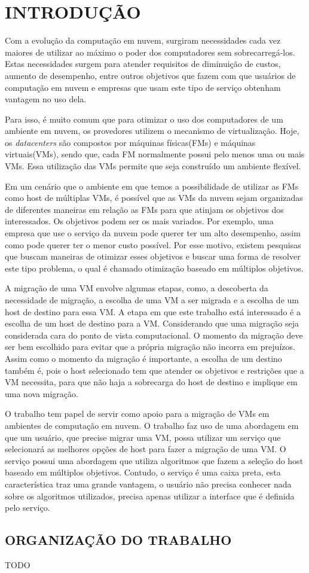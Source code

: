 \chapter{INTRODUÇÃO}
\label{chap:introducao}

Com a evolução da computação em nuvem, surgiram necessidades cada vez maiores de utilizar ao 
máximo o poder dos computadores sem sobrecarregá-los. Estas necessidades surgem para atender 
requisitos de diminuição de custos, aumento de desempenho, entre outros objetivos que fazem com que 
usuários de computação em nuvem e empresas que usam este tipo de serviço obtenham vantagem no uso dela.

Para isso, é muito comum que para otimizar o uso dos computadores de um ambiente em nuvem, 
os provedores utilizem o mecanismo de virtualização. Hoje, os \textit{datacenters} são compostos 
por máquinas físicas(FMs) e máquinas virtuais(VMs), sendo que, cada FM normalmente possui 
pelo menos uma ou mais VMs. Essa utilização das VMs permite que seja construído um ambiente flexível.

Em um cenário que o ambiente em que temos a possibilidade de utilizar as FMs como host de múltiplas VMs,
 é possível que as VMs da nuvem sejam organizadas de diferentes maneiras em relação as FMs para que atinjam 
 os objetivos dos interessados. Os objetivos podem ser os mais variados. Por exemplo, uma empresa que 
 use o serviço da nuvem pode querer ter um alto desempenho, assim como pode querer ter o menor custo 
 possível. Por esse motivo, existem pesquisas que buscam maneiras de otimizar esses objetivos e buscar 
 uma forma de resolver este tipo problema, o qual é chamado otimização baseado em múltiplos objetivos. 

A migração de uma VM envolve algumas etapas, como, a descoberta da necessidade de migração, 
a escolha de uma VM a ser migrada e a escolha de um host de destino para essa VM.
 A etapa em que este trabalho está interessado é a escolha de um host de destino para a VM. 
 Considerando que uma migração seja considerada cara do ponto de vista computacional. 
 O momento da migração deve ser bem escolhido para evitar que a própria migração não incorra em 
 prejuízos. Assim como o momento da migração é importante, a escolha de um destino também é, 
 pois o host selecionado tem que atender os objetivos e restrições que a VM necessita, para que 
 não haja a sobrecarga do host de destino e implique em uma nova migração.

O trabalho tem papel de servir como apoio para a migração de VMs em ambientes de computação em nuvem. 
O trabalho faz uso de uma abordagem em que um usuário, que precise migrar uma VM, possa 
utilizar um serviço que selecionará as melhores opções de host para fazer a migração de uma VM. 
O serviço possui uma abordagem que utiliza algoritmos que fazem a seleção do host baseado em múltiplos objetivos.
 Contudo, o serviço é uma caixa preta, esta característica traz uma grande vantagem, o usuário não precisa conhecer nada 
 sobre os algoritmos utilizados, precisa apenas utilizar a interface que é definida pelo serviço. 

\section{ORGANIZAÇÃO DO TRABALHO}
\label{sec:organizacaoTrabalho}

TODO